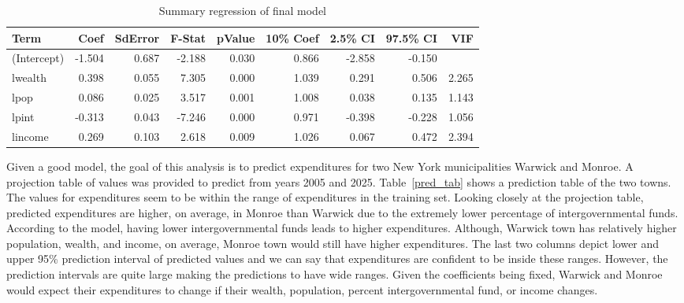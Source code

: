 \documentclass[11pt]{article}\usepackage[]{graphicx}\usepackage[]{color}
\begin{document}
\begin{center}
\begin{table}[ht]
\centering
\begin{tabular}{lrrrrrrrr}
  \hline
Term & Coef & SdError & F-Stat & pValue & 10\% Coef & 2.5\% CI & 97.5\% CI & VIF \\ 
  \hline
(Intercept) & -1.504 & 0.687 & -2.188 & 0.030 & 0.866 & -2.858 & -0.150 &  \\ 
  lwealth & 0.398 & 0.055 & 7.305 & 0.000 & 1.039 & 0.291 & 0.506 & 2.265 \\ 
  lpop & 0.086 & 0.025 & 3.517 & 0.001 & 1.008 & 0.038 & 0.135 & 1.143 \\ 
  lpint & -0.313 & 0.043 & -7.246 & 0.000 & 0.971 & -0.398 & -0.228 & 1.056 \\ 
  lincome & 0.269 & 0.103 & 2.618 & 0.009 & 1.026 & 0.067 & 0.472 & 2.394 \\ 
   \hline
\end{tabular}
\caption{Summary regression of final model} 
\label{reg_summary_final}
\end{table}

\end{center}

\noindent Given a good model, the goal of this analysis is to predict expenditures for two New York municipalities Warwick and Monroe. A projection table of values was provided to predict from years 2005 and 2025. Table~\ref{pred_tab} shows a prediction table of the two towns. The values for expenditures seem to be within the range of expenditures in the training set. Looking closely at the projection table, predicted expenditures are higher, on average, in Monroe than Warwick due to the extremely lower percentage of intergovernmental funds. According to the model, having lower intergovernmental funds leads to higher expenditures. Although, Warwick town has relatively higher population, wealth, and income, on average, Monroe town would still have higher expenditures. The last two columns depict lower and upper 95\% prediction interval of predicted values and we can say that expenditures are confident to be inside these ranges. However, the prediction intervals are quite large making the predictions to have wide ranges. Given the coefficients being fixed, Warwick and Monroe would expect their expenditures to change if their wealth, population, percent intergovernmental fund, or income changes.    
\end{document}
